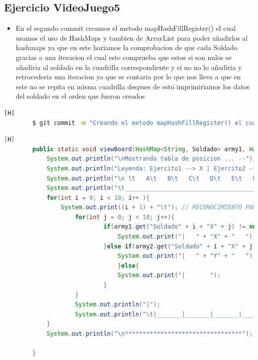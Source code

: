 \documentclass{article}
\begin{document}
	\subsection{Ejercicio VideoJuego5}
	\begin{itemize}	
		\item En el segundo commit creamos el metodo mapHashFillRegister() el cual usamos el uso de HashMaps y tambien de ArrayList para poder añadirlos al hashmaps ya que en este hariamos la comprobacion de que cada Soldado gracias a una iteracion el cual este comprueba que estos si son nulos se añadiria al soldado en la cuadrilla correspondiente y si no no lo añadiria y retrocederia una iteracion ya que se contaria por lo que nos lleva a que en este no se repita en misma cuadrilla despues de esto imprimiriamos los datos del soldado en el orden que fueron creados
	\end{itemize}	
	\begin{lstlisting}[language=bash,caption={Commit}][H]
		$ git commit -m "Creando el metodo mapHashFillRegister() el cual usamos el uso de HashMaps y tambien de ArrayList para poder anadirlos al hashmaps ya que en este hariamos la comprobacion de que cada Soldado en este no se repita en misma cuadrilla despues de esto imprimiriamos los datos del soldado en el orden que fueron creados"
	\end{lstlisting}	
	\begin{lstlisting}[language=java,caption={Las lineas de codigos del metodo creado:}][H]
		public static void viewBoard(HashMap<String, Soldado> army1, HashMap<String, Soldado> army2){ //EN ESTE METODO DEMOSTRAREMOS LA TABLA REUTILIZAREMOS CODIGOS DE ANTERIORES LABORATORIOS PARA PODER HACER LA BASE DE ESTE TABLERO
			System.out.println("\nMostrando tabla de posicion ... --");
			System.out.println("Leyenda: Ejercito1 --> X | Ejercito2 --> Y"); //RECONOCIMIENTO PARA LOS EJERCITOS Y POSICION DE SUS SOLDADOS
			System.out.println("\n \t   A\t   B\t   C\t   D\t   E\t   F\t   G\t   H\t   I\t   J"); // RECONOCIMIENTO PARA CADA UBICACION DE CADA SOLDADO EN EL TABLERO POR PARTE DE LAS COLUMNAS
			System.out.println("\t_________________________________________________________________________________");
			for(int i = 0; i < 10; i++ ){
				System.out.print((i + 1) + "\t"); // RECONOCIMIENTO PARA CADA UBICACION DE CADA SOLDADO EN EL TABLERO POR PARTE DE LAS FILAS
					for(int j = 0; j < 10; j++){
							if(army1.get("Soldado" + i + "X" + j) != null){
								System.out.print("|   " + "X" + "   "); //VERIFICANDOLA POSICIONES DE CADA SOLDADO DE CADA EJERCITO CON SU RESPECTIVO INDICADOR PARA PODER UBICARLOS
							}else if(army2.get("Soldado" + i + "X" + j) != null){
								System.out.print("|   " + "Y" + "   ");
								}else{
								System.out.print("|       ");
							}
					}
					System.out.println("|");
					System.out.println("\t|_______|_______|_______|_______|_______|_______|_______|_______|_______|_______|");
			}
			System.out.println("\n*********************************");

		}
	\end{lstlisting}
\end{document}
